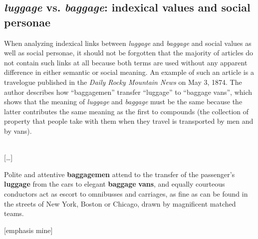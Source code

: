 \subsection{\emph{luggage} vs. \emph{baggage}: indexical values and social personae}
\label{bkm:Ref534386276}\hypertarget{Toc63021243}{}
When analyzing indexical links between \emph{luggage} and \emph{baggage} and social values as well as social personae, it should not be forgotten that the majority of articles do not contain such links at all because both terms are used without any apparent difference in either semantic or social meaning. An example of such an article is a travelogue published in the \emph{Daily Rocky Mountain News} on May 3, 1874. The author describes how “baggagemen” transfer “luggage” to “baggage vans”, which shows that the meaning of \emph{luggage} and \emph{baggage} must be the same because the latter contributes the same meaning as the first to compounds (the collection of property that people take with them when they travel is transported by men and by vans).

\begin{ipquote}
\begin{center}
\\
{[…]}
\end{center}
{Polite and attentive \textbf{baggagemen} attend to the transfer of the passenger's \textbf{luggage} from the cars to elegant \textbf{baggage} \textbf{vans}, and equally courteous conductors act as escort to omnibusses and carriages, as fine as can be found in the streets of New York, Boston or Chicago, drawn by magnificent matched teams.

\raggedleft
{[emphasis mine]}\\
}
\end{ipquote}

